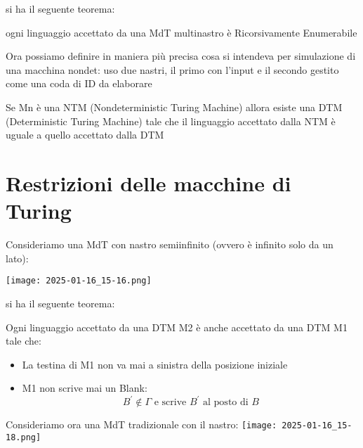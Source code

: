 	si ha il seguente teorema:
	\begin{theorem}
		ogni linguaggio accettato da una MdT multinastro è Ricorsivamente Enumerabile
	\end{theorem}
	Ora possiamo definire in maniera più precisa cosa si intendeva per simulazione di una macchina
	nondet: uso due nastri, il primo con l'input e il secondo gestito come una coda di ID da elaborare
	\begin{theorem}
		Se Mn è una NTM (Nondeterministic Turing Machine) allora esiste una DTM
		(Deterministic Turing Machine) tale che il linguaggio accettato dalla NTM è uguale a quello accettato
		dalla DTM
	\end{theorem}
	\section{Restrizioni delle macchine di Turing}
	Consideriamo una MdT con nastro semiinfinito (ovvero è infinito solo da un lato):
	\begin{center}
			\texttt{[image: 2025-01-16\_15-16.png]}

	\end{center}
	si ha il seguente teorema:
	\begin{theorem}
		Ogni linguaggio accettato da una DTM M2 è anche accettato da una DTM M1 tale che:
		\begin{itemize}
			\item La testina di M1 non va mai a sinistra della posizione iniziale
			\item M1 non scrive mai un Blank:
			      $$B^{'}\not\in\Gamma \mbox{  e scrive }B^{'} \mbox{ al posto di } B$$
		\end{itemize}
	\end{theorem}
	Consideriamo ora una MdT tradizionale con il nastro:
			\texttt{[image: 2025-01-16\_15-18.png]}

